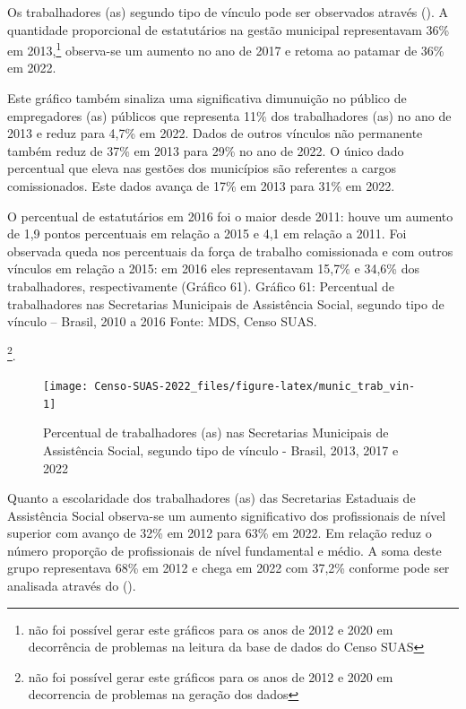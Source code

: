 \documentclass[
  brazilian]{report}
\begin{document}
Os trabalhadores (as) segundo tipo de vínculo pode ser observados
através (). A quantidade proporcional de
estatutários na gestão municipal representavam 36\% em
2013,\footnote{não foi possível gerar este gráficos para os anos de 2012 e 2020 em decorrência de problemas na leitura da base de dados do Censo SUAS}
observa-se um aumento no ano de 2017 e retoma ao patamar de 36\% em
2022.

Este gráfico também sinaliza uma significativa dimunuição no público de
empregadores (as) públicos que representa 11\% dos trabalhadores (as) no
ano de 2013 e reduz para 4,7\% em 2022. Dados de outros vínculos não
permanente também reduz de 37\% em 2013 para 29\% no ano de 2022. O
único dado percentual que eleva nas gestões dos municípios são
referentes a cargos comissionados. Este dados avança de 17\% em 2013
para 31\% em 2022.

O percentual de estatutários em 2016 foi o maior desde 2011: houve um
aumento de 1,9 pontos percentuais em relação a 2015 e 4,1 em relação a
2011. Foi observada queda nos percentuais da força de trabalho
comissionada e com outros vínculos em relação a 2015: em 2016 eles
representavam 15,7\% e 34,6\% dos trabalhadores, respectivamente
(Gráfico 61). Gráfico 61: Percentual de trabalhadores nas Secretarias
Municipais de Assistência Social, segundo tipo de vínculo -- Brasil,
2010 a 2016 Fonte: MDS, Censo SUAS.

\footnote{não foi possível gerar este gráficos para os anos de 2012 e 2020 em decorrencia de problemas na geração dos dados}.

\begin{figure}
\texttt{[image: Censo-SUAS-2022\_files/figure-latex/munic\_trab\_vin-1]} \caption[Percentual de trabalhadores (as) nas Secretarias Municipais de Assistência Social, segundo tipo de vínculo - Brasil, 2013, 2017 e 2022]{Percentual de trabalhadores (as) nas Secretarias Municipais de Assistência Social, segundo tipo de vínculo - Brasil, 2013, 2017 e 2022}\label{fig:munic_trab_vin}
\end{figure}

Quanto a escolaridade dos trabalhadores (as) das Secretarias Estaduais
de Assistência Social observa-se um aumento significativo dos
profissionais de nível superior com avanço de 32\% em 2012 para 63\% em
2022. Em relação reduz o número proporção de profissionais de nível
fundamental e médio. A soma deste grupo representava 68\% em 2012 e
chega em 2022 com 37,2\% conforme pode ser analisada através do
().
\end{document}
